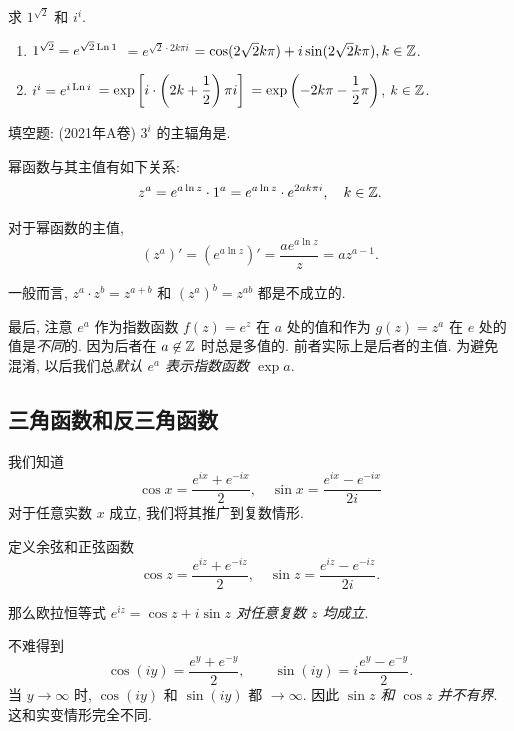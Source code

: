 \documentclass[nocolor,theme=doremi,lang=cn,11pt,chinese,twoside,openright,usesamecnt]{elegantbook}
\newenvironment{alertblock}[1]{\begin{tcolorbox}[alertstyle,title=#1]}{\end{tcolorbox}}
\begin{document}
\begin{example}
	求 $1^{\sqrt 2}$ 和 $i^i$.
\end{example}
\begin{solution}
	\begin{enumerate}
		\item $1^{\sqrt2}=e^{\sqrt2\operatorname{Ln}1}$
			{$=e^{\sqrt 2\cdot 2k\pi i}$}
			{$=\cos(2\sqrt 2k\pi)+i\sin(2\sqrt 2k\pi), k\in{\mathbb{Z}}$.}
		\item $i^i=e^{i\operatorname{Ln} i}$
			{$\displaystyle=\exp\left[i\cdot\left(2k+\frac{1}{2}\right)\pi i\right]$}
			{$\displaystyle=\exp\left(-2k\pi-\frac{1}{2}\pi\right)$, $k\in{\mathbb{Z}}$.}
	\end{enumerate}
\end{solution}
\begin{exercise}
	填空题: (2021年A卷) $3^i$ 的主辐角是.
\end{exercise}

幂函数与其主值有如下关系:
\[z^a=e^{a\ln z}\cdot 1^a
=e^{a\ln z}\cdot e^{2ak\pi i},\quad k\in{\mathbb{Z}}.\]

对于幂函数的主值,
\[(z^a)'=\left(e^{a\ln z}\right)'=\frac{ae^{a\ln z}}z=az^{a-1}.\]

一般而言, $z^a\cdot z^b=z^{a+b}$ 和 $(z^a)^b=z^{ab}$ 都是不成立的.

最后, 注意 $e^a$ 作为指数函数 $f(z)=e^z$ 在 $a$ 处的值和作为 $g(z)=z^a$ 在 $e$ 处的值是\emph{不同}的.
因为后者在 $a\not\in{\mathbb{Z}}$ 时总是多值的.
前者实际上是后者的主值.
为避免混淆, 以后我们总\emph{默认 $e^a$ 表示指数函数 $\exp a$}.

\subsection{三角函数和反三角函数}

我们知道
\[\cos x=\frac{e^{ix}+e^{-ix}}2,\quad
\sin x=\frac{e^{ix}-e^{-ix}}{2i}\]
对于任意实数 $x$ 成立,
我们将其推广到复数情形.

\begin{alertblock}{余弦和正弦函数}
	定义余弦和正弦函数
	\[\displaystyle\cos z=\frac{e^{iz}+e^{-iz}}2,\quad
	\sin z=\frac{e^{iz}-e^{-iz}}{2i}.\]
\end{alertblock}

那么欧拉恒等式 \emph{$e^{iz}=\cos z+i\sin z$ 对任意复数 $z$ 均成立}.

不难得到
\[
	\cos(iy)=\dfrac{e^y+e^{-y}}2,\qquad
	{\sin(iy)=i\dfrac{e^y-e^{-y}}2.}
\]
当 $y\to\infty$ 时, $\cos(iy)$ 和 $\sin(iy)$ 都 $\to\infty$.
因此 \emph{$\sin z$ 和 $\cos z$ 并不有界}. 
这和实变情形完全不同.
\end{document}
